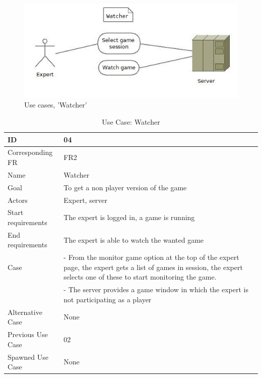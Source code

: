 \begin{figure}[H]
  \centering
    \includegraphics[width=1.0\textwidth]{img/watcher.jpg}
  \caption{Use cases, 'Watcher'} 
  \label{fig:watcher}
\end{figure}


\begin{table}[H]
\begin{tabular}{|l|p{14cm}|}
\hline
	\textbf{ID} & \textbf{04}\\ \hline
	Corresponding FR & FR2\\ \hline
	Name & Watcher\\ \hline
	Goal & To get a non player version of the game\\ \hline
	Actors & Expert, server\\ \hline
	Start requirements & The expert is logged in, a game is running \\ \hline
	End requirements & The expert is able to watch the wanted game\\ \hline
	Case & - From the monitor game option at the top of the expert page, the expert gets a list of games in session, the expert selects one of these to start monitoring the game.\\
		 & - The server provides a game window in which the expert is not participating as a player\\ \hline
	Alternative Case & None \\ \hline
	Previous Use Case & 02\\ \hline
	Spawned Use Case & None\\ \hline
\end{tabular}
\caption{Use Case: Watcher}
\label{fig:usecase04table}
\end{table}


